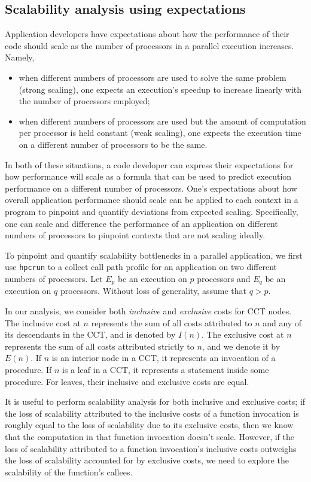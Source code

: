 \documentclass[12pt]{article}
\begin{document}
\subsection{Scalability analysis using expectations}
Application developers have expectations about how the performance of their code should scale as the number of processors in a parallel execution increases. Namely,
\begin{itemize}
\item when different numbers of
processors are used to solve the same problem (strong scaling), one
expects an execution's speedup to increase linearly with the number of processors employed;
\item when
different numbers of processors are used but the amount of computation
per processor is held constant (weak scaling), one expects the execution
time on a different number of processors to be the same.
\end{itemize}

In both of these situations, a code developer can express their expectations for how performance will scale as a formula that can be used to predict execution performance on a different number of processors. One's expectations about how overall application performance should scale can be applied to each context in a program
to pinpoint and quantify deviations from expected scaling. Specifically, one can scale and difference the performance of an application on different numbers of processors to pinpoint contexts that are not scaling ideally.

To pinpoint and quantify scalability bottlenecks in a parallel application, we first use {\tt hpcrun} to a collect call path profile for an application on two different numbers of processors.  Let $E_p$ be an execution on $p$ processors and $E_q$ be an execution on $q$ processors. Without loss of generality, assume that $q > p$.

In our analysis, we consider both {\it inclusive} and {\it exclusive}
costs for CCT nodes.  The inclusive cost at $n$ represents the sum of
all costs attributed to $n$ and any of its descendants in the CCT, and
is denoted by $I(n)$.  The exclusive cost at $n$ represents the sum of
all costs attributed strictly to $n$, and we denote it by $E(n)$. If
$n$ is an interior node in a CCT, it represents an invocation of a
procedure.  If $n$ is a leaf in a CCT, it represents a statement inside
some procedure. For leaves, their inclusive and exclusive costs are equal.

It is
useful to perform scalability analysis for both inclusive and
exclusive costs; if the loss of scalability attributed to the
inclusive costs of a function invocation is roughly equal to the loss
of scalability due to its exclusive costs, then we know that the
computation in that function invocation doesn't scale. However, if the
loss of scalability attributed to a function invocation's inclusive
costs outweighs the loss of scalability accounted for by exclusive
costs, we need to explore the scalability of the function's callees.
\end{document}
